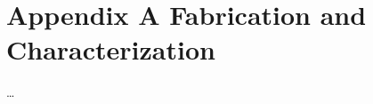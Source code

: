 \chapter{Appendix A Fabrication and Characterization}\label{ch:myappendix}

\ldots

\instructionsappendices





\cleardoublepage

